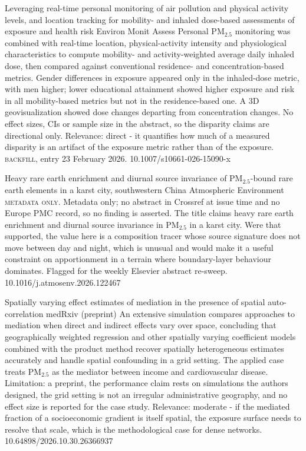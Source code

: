 \documentclass[10pt]{article}
\begin{document}
{Leveraging real-time personal monitoring of air pollution and physical activity levels, and location tracking for mobility- and inhaled dose-based assessments of exposure and health risk}
{Environ Monit Assess}
{Personal PM$_{2.5}$ monitoring was combined with real-time location, physical-activity intensity and physiological characteristics to compute mobility- and activity-weighted average daily inhaled dose, then compared against conventional residence- and concentration-based metrics. Gender differences in exposure appeared only in the inhaled-dose metric, with men higher; lower educational attainment showed higher exposure and risk in all mobility-based metrics but not in the residence-based one. A 3D geovisualization showed dose changes departing from concentration changes. No effect sizes, CIs or sample size in the abstract, so the disparity claims are directional only. Relevance: direct - it quantifies how much of a measured disparity is an artifact of the exposure metric rather than of the exposure. \textsc{backfill}, entry 23 February 2026.}
{10.1007/s10661-026-15090-x}

{Heavy rare earth enrichment and diurnal source invariance of PM$_{2.5}$-bound rare earth elements in a karst city, southwestern China}
{Atmospheric Environment}
{\textsc{metadata only.} Metadata only; no abstract in Crossref at issue time and no Europe PMC record, so no finding is asserted. The title claims heavy rare earth enrichment and diurnal source invariance in PM$_{2.5}$ in a karst city. Were that supported, the value here is a composition tracer whose source signature does not move between day and night, which is unusual and would make it a useful constraint on apportionment in a terrain where boundary-layer behaviour dominates. Flagged for the weekly Elsevier abstract re-sweep.}
{10.1016/j.atmosenv.2026.122467}

{Spatially varying effect estimates of mediation in the presence of spatial auto-correlation}
{medRxiv (preprint)}
{An extensive simulation compares approaches to mediation when direct and indirect effects vary over space, concluding that geographically weighted regression and other spatially varying coefficient models combined with the product method recover spatially heterogeneous estimates accurately and handle spatial confounding in a grid setting. The applied case treats PM$_{2.5}$ as the mediator between income and cardiovascular disease. Limitation: a preprint, the performance claim rests on simulations the authors designed, the grid setting is not an irregular administrative geography, and no effect size is reported for the case study. Relevance: moderate - if the mediated fraction of a socioeconomic gradient is itself spatial, the exposure surface needs to resolve that scale, which is the methodological case for dense networks.}
{10.64898/2026.10.30.26366937}
\end{document}
